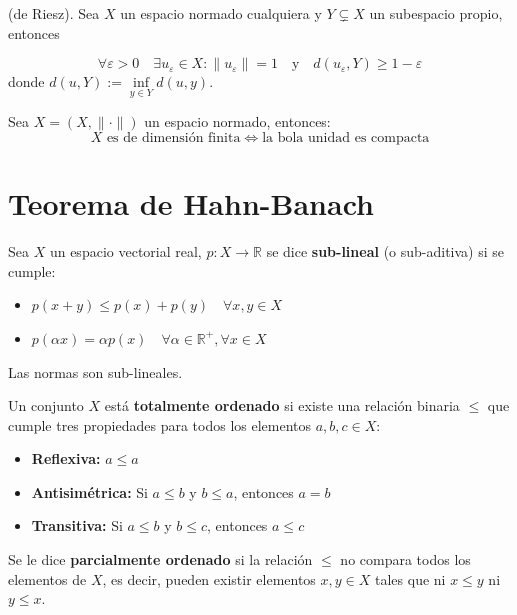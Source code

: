 \documentclass[12pt]{book}
\newcommand{\tbf}{\textbf}
\begin{document}
\begin{lema}(de Riesz).
    Sea $X$ un espacio normado cualquiera y $Y \subsetneq X$ un subespacio propio, entonces

    \begin{equation*}
        \forall \varepsilon > 0 \quad \exists u_\varepsilon \in X : \|u_\varepsilon\| = 1 \quad \text{y} \quad d(u_\varepsilon, Y) \geq 1-\varepsilon
    \end{equation*}
    donde $d(u, Y) := \inf\limits_{y \in Y} d(u, y)$.
\end{lema}


\begin{teo}\label{teo:compacto-dim-finita}
    Sea $X = (X, \|\cdot\|)$ un espacio normado, entonces:
    \begin{equation*}
        X \text{ es de dimensión finita} \iff \text{la bola unidad es compacta}
    \end{equation*}
\end{teo}

\chapter{Teorema de Hahn-Banach}


\begin{definicion}
    Sea $X$ un espacio vectorial real, $p: X \to \mathbb{R}$ se dice \textbf{sub-lineal} (o sub-aditiva) si se cumple:
    \begin{itemize}
        \item[i)] $p(x+y) \leq p(x) + p(y) \quad \forall x, y \in X$
        \item[ii)] $p(\alpha x) = \alpha p(x) \quad \forall \alpha \in \mathbb{R}^+, \forall x \in X$
    \end{itemize}
\end{definicion}

\begin{ejemplo}
    Las normas son sub-lineales. \\
\end{ejemplo}

\begin{definicion}
    Un conjunto $X$ está \tbf{totalmente ordenado} si existe una relación binaria $\leq$ que cumple tres propiedades para todos los elementos $a, b, c \in X$:
    \begin{itemize}
        \item[i)] \textbf{Reflexiva:} $a \leq a$
        \item[ii)] \textbf{Antisimétrica:} Si $a \leq b$ y $b \leq a$, entonces $a = b$
        \item[iii)] \textbf{Transitiva:} Si $a \leq b$ y $b \leq c$, entonces $a \leq c$
    \end{itemize}
    Se le dice \tbf{parcialmente ordenado} si la relación $\leq$ no compara todos los elementos de $X$, es decir, pueden existir elementos $x, y \in X$ tales que ni $x \leq y$ ni $y \leq x$.
\end{definicion}
\end{document}

